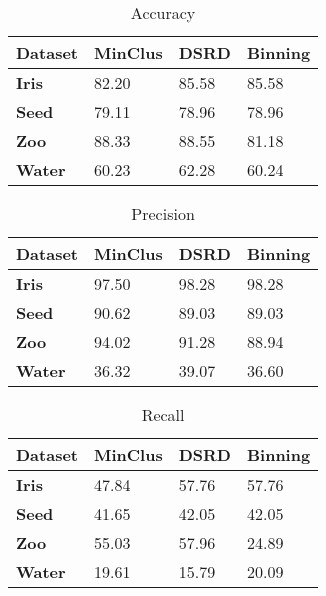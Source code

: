 \begin{table}[H]
\caption{Accuracy} 
\begin{center}
		\begin{tabular}{ | l | l | l | l |}
				\hline

				\textbf{Dataset} & \textbf{MinClus} & \textbf{DSRD} & \textbf{Binning} \\ \hline
                \textbf{Iris} & 82.20 & 85.58 & 85.58 \\ \hline
                \textbf{Seed} & 79.11 & 78.96 & 78.96 \\ \hline
                \textbf{Zoo} & 88.33 & 88.55 & 81.18  \\ \hline
                \textbf{Water} & 60.23 & 62.28 & 60.24  \\ \hline
		\end{tabular}
\end{center}
\label{table:acc1}
\end{table}



\begin{table}[H]
\caption{Precision} 
\begin{center}
		\begin{tabular}{ | l | l | l | l |}
				\hline

				\textbf{Dataset} & \textbf{MinClus} & \textbf{DSRD} & \textbf{Binning} \\ \hline

				\textbf{Iris} & 97.50 & 98.28 & 98.28 \\ \hline
				\textbf{Seed} & 90.62 & 89.03 & 89.03 \\ \hline
				\textbf{Zoo} & 94.02 & 91.28 & 88.94  \\ \hline
				\textbf{Water} & 36.32 & 39.07 & 36.60 \\ \hline
		\end{tabular}
\end{center}
\label{table:pre1}
\end{table}


\begin{table}[H]
\caption{Recall} 
\begin{center}
		\begin{tabular}{ | l | l | l | l |}
				\hline

				\textbf{Dataset} & \textbf{MinClus} & \textbf{DSRD} & \textbf{Binning} \\ \hline

				\textbf{Iris} &  47.84 & 57.76 & 57.76 \\ \hline
				\textbf{Seed} & 41.65 & 42.05 & 42.05 \\ \hline
				\textbf{Zoo} & 55.03 & 57.96 & 24.89  \\ \hline
				\textbf{Water} & 19.61 & 15.79 & 20.09 \\ \hline
		\end{tabular}
\end{center}
\label{table:rec1}
\end{table}

